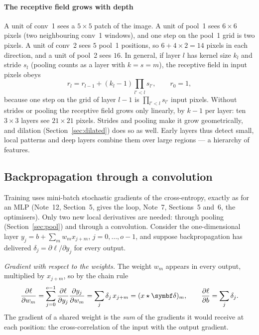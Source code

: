 \documentclass[11pt]{article}
\newcommand{\vdelta}{\vect{\delta}}
\begin{document}
\paragraph{The receptive field grows with depth} A unit of conv~1 sees a $5 \times 5$ patch of the image. A unit of
pool~1 sees $6 \times 6$ pixels (two neighbouring conv~1 windows), and one step on the pool~1 grid is two pixels. A unit of
conv~2 sees $5$ pool~1 positions, so $6 + 4 \times 2 = 14$ pixels in each direction, and a unit of pool~2 sees $16$. In
general, if layer $l$ has kernel size $k_l$ and stride $s_l$ (pooling counts as a layer with $k = s = m$), the receptive
field in input pixels obeys
\begin{equation}\label{eq:rf}
  r_l = r_{l-1} + (k_l - 1)\prod_{l' < l} s_{l'}, \qquad r_0 = 1 ,
\end{equation}
because one step on the grid of layer $l - 1$ is $\prod_{l' < l} s_{l'}$ input pixels. Without strides or pooling the
receptive field grows only linearly, by $k - 1$ per layer: ten $3 \times 3$ layers see $21 \times 21$ pixels. Strides and
pooling make it grow geometrically, and dilation (Section~\ref{sec:dilated}) does so as well. Early
layers thus detect small, local patterns and deep layers combine them over large regions --- a hierarchy of features.

\subsection{Backpropagation through a convolution}\label{sec:backprop}

Training uses mini-batch stochastic gradients of the cross-entropy, exactly as for an MLP (Note~12, Section~5, gives the
loop, Note~7, Sections~5 and~6, the optimisers). Only two new local derivatives are needed: through pooling (Section~\ref{sec:pool}) and
through a convolution. Consider the one-dimensional layer $y_j = b + \sum_m w_m x_{j+m}$, $j = 0, \dots, o - 1$, and
suppose backpropagation has delivered $\delta_j = \partial \ell/\partial y_j$ for every output.

\emph{Gradient with respect to the weights.} The weight $w_m$ appears in every output, multiplied by $x_{j+m}$, so by the
chain rule
\begin{equation}\label{eq:gradw}
  \frac{\partial \ell}{\partial w_m} = \sum_{j=0}^{o-1} \frac{\partial \ell}{\partial y_j}\frac{\partial y_j}{\partial w_m}
  = \sum_j \delta_j\, x_{j+m} = (x \star \vdelta)_m , \qquad
  \frac{\partial \ell}{\partial b} = \sum_j \delta_j .
\end{equation}
The gradient of a shared weight is the \emph{sum} of the gradients it would receive at each position: the cross-correlation
of the input with the output gradient.
\end{document}
